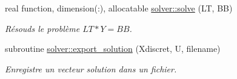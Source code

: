 \begin{DoxyCompactItemize}
real function, dimension(\+:), allocatable \hyperlink{namespacesolver_af3691d2059a024a82bab7751a99e6006}{solver\+::solve} (LT, BB)
\begin{DoxyCompactList}\small\item\em Résouds le problème $ LT*Y = BB$. \end{DoxyCompactList}\item 
subroutine \hyperlink{namespacesolver_a2456ddba19a0992671f59ac396d4c1f1}{solver\+::export\+\_\+solution} (Xdiscret, U, filename)
\begin{DoxyCompactList}\small\item\em Enregistre un vecteur solution dans un fichier. \end{DoxyCompactList}\end{DoxyCompactItemize}
